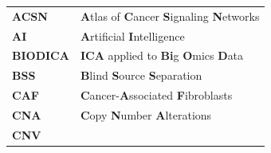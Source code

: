\documentclass[12pt,]{book}
\theoremstyle{definition}
\theoremstyle{definition}
\theoremstyle{definition}
\theoremstyle{remark}
\begin{document}
\begin{longtable}[]{@{}ll@{}}
\toprule
\begin{minipage}[t]{0.14\columnwidth}\raggedright
\textbf{ACSN}\strut
\end{minipage} & \begin{minipage}[t]{0.80\columnwidth}\raggedright
\textbf{A}tlas of \textbf{C}ancer \textbf{S}ignaling
\textbf{N}etworks\strut
\end{minipage}\tabularnewline
\begin{minipage}[t]{0.14\columnwidth}\raggedright
\textbf{AI}\strut
\end{minipage} & \begin{minipage}[t]{0.80\columnwidth}\raggedright
\textbf{A}rtificial \textbf{I}ntelligence\strut
\end{minipage}\tabularnewline
\begin{minipage}[t]{0.14\columnwidth}\raggedright
\textbf{BIODICA}\strut
\end{minipage} & \begin{minipage}[t]{0.80\columnwidth}\raggedright
\textbf{ICA} applied to \textbf{Bi}g \textbf{O}mics \textbf{D}ata\strut
\end{minipage}\tabularnewline
\begin{minipage}[t]{0.14\columnwidth}\raggedright
\textbf{BSS}\strut
\end{minipage} & \begin{minipage}[t]{0.80\columnwidth}\raggedright
\textbf{B}lind \textbf{S}ource \textbf{S}eparation\strut
\end{minipage}\tabularnewline
\begin{minipage}[t]{0.14\columnwidth}\raggedright
\textbf{CAF}\strut
\end{minipage} & \begin{minipage}[t]{0.80\columnwidth}\raggedright
\textbf{C}ancer-\textbf{A}ssociated \textbf{F}ibroblasts\strut
\end{minipage}\tabularnewline
\begin{minipage}[t]{0.14\columnwidth}\raggedright
\textbf{CNA}\strut
\end{minipage} & \begin{minipage}[t]{0.80\columnwidth}\raggedright
\textbf{C}opy \textbf{N}umber \textbf{A}lterations\strut
\end{minipage}\tabularnewline
\begin{minipage}[t]{0.14\columnwidth}\raggedright
\textbf{CNV}\strut
\end{minipage} & \begin{minipage}[t]{0.80\columnwidth}\raggedright

\end{minipage}
\end{longtable}
\end{document}
